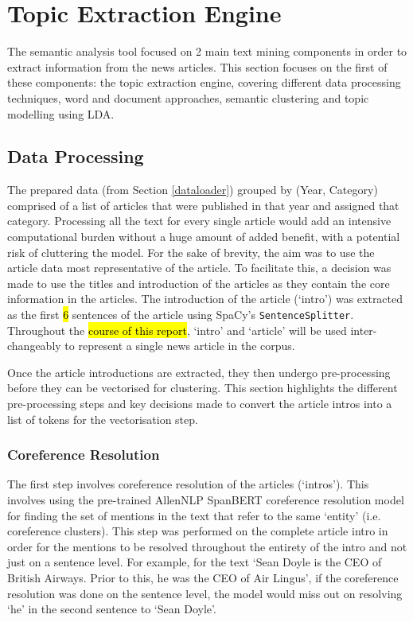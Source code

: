 \chapter{Topic Extraction Engine}

The semantic analysis tool focused on 2 main text mining components in order to extract information from the news articles. This section focuses on the first of these components: the topic extraction engine, covering different data processing techniques, word and document approaches, semantic clustering and topic modelling using LDA. 

\section{Data Processing} \label{procesing_topic}

The prepared data (from Section \ref{dataloader}) grouped by (Year, Category) comprised of a list of articles that were published in that year and assigned that category. Processing all the text for every single article would add an intensive computational burden without a huge amount of added benefit, with a potential risk of cluttering the model. For the sake of brevity, the aim was to use the article data most representative of the article. To facilitate this, a decision was made to use the titles and introduction of the articles as they contain the core information in the articles. The introduction of the article (`intro') was extracted as the first \hl{6} sentences of the article using SpaCy's \texttt{SentenceSplitter}. Throughout the \hl{course of this report}, `intro' and `article' will be used inter-changeably to represent a single news article in the corpus. 

Once the article introductions are extracted, they then undergo pre-processing before they can be vectorised for clustering. This section highlights the different pre-processing steps and key decisions made to convert the article intros into a list of tokens for the vectorisation step.

\subsection{Coreference Resolution} \label{coref}
The first step involves coreference resolution of the articles (`intros'). This involves using the pre-trained AllenNLP SpanBERT coreference resolution model for finding the set of mentions in the text that refer to the same `entity' (i.e. coreference clusters). This step was performed on the complete article intro in order for the mentions to be resolved throughout the entirety of the intro and not just on a sentence level. For example, for the text `Sean Doyle is the CEO of British Airways. Prior to this, he was the CEO of Air Lingus', if the coreference resolution was done on the sentence level, the model would miss out on resolving `he' in the second sentence to `Sean Doyle'.

